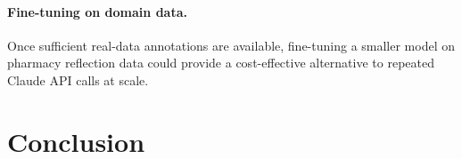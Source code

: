 \documentclass[11pt]{article}
\begin{document}
\paragraph{Fine-tuning on domain data.}
Once sufficient real-data annotations are available, fine-tuning a smaller model on pharmacy reflection data could provide a cost-effective alternative to repeated Claude API calls at scale.





\section{Conclusion}
\end{document}
